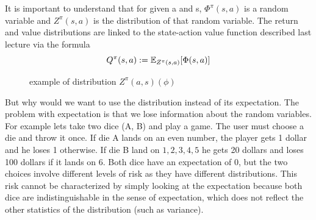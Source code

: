 \documentclass{article}
\begin{document}
It is important to understand that for given a and s, $\Phi^\pi(s, a)$ is a random variable and $Z^\pi(s, a)$ is the distribution of that random variable.
The return and value distributions are linked to the state-action value function described last lecture via the formula 
\begin{equation}
    Q^\pi(s, a) := \mathbb{E}_{Z^\pi(s, a)}[\Phi(s, a)]
\end{equation}

\begin{figure}[H]
    \centering
    \caption{example of distribution $Z^\pi(a,s)(\phi)$}
\end{figure}

But why would we want to use the distribution instead of its expectation. The problem with expectation is that we lose information about the random variables. \\

For example lets take two dice (A, B) and play a game. The user must choose a die and throw it once. If die A lands on an even number, the player gets 1 dollar and he loses 1 otherwise. If die B land on ${1, 2, 3, 4 ,5}$ he gets 20 dollars and loses 100 dollars if it lands on 6. 
Both dice have an expectation of 0,
but the two choices involve different levels of risk as they have different distributions. 
This risk cannot be characterized by simply looking at the expectation because both dice are indistinguishable in the sense of expectation, which does not reflect the other statistics of the distribution (such as variance).\\
\end{document}

